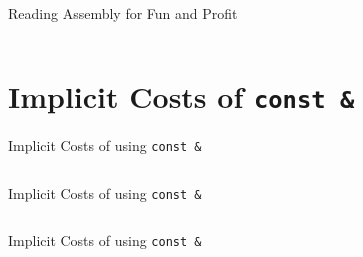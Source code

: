 \begin{frame}[fragile]{Reading Assembly for Fun and Profit}
    \begin{columns}[t]
        \begin{column}{.45\textwidth}

        \end{column}
        \begin{column}{.45\textwidth}
        \end{column}
    \end{columns}

\end{frame}

\section{Implicit Costs of \texttt{const \&}}

\begin{frame}[fragile]{Implicit Costs of using \texttt{const \&}}
    \begin{columns}[t]
        \begin{column}{.45\textwidth}
        \end{column}
        \begin{column}{.45\textwidth}
        \end{column}
    \end{columns}
\end{frame}

\begin{frame}[fragile]{Implicit Costs of using \texttt{const \&}}
    \begin{columns}[t]
        \begin{column}{.45\textwidth}
        \end{column}
        \begin{column}{.45\textwidth}
        \end{column}
    \end{columns}
\end{frame}

\begin{frame}[fragile]{Implicit Costs of using \texttt{const \&}}
    \begin{columns}[t]
        \begin{column}{.45\textwidth}
        \end{column}
        \begin{column}{.45\textwidth}
        \end{column}
    \end{columns}
\end{frame}

